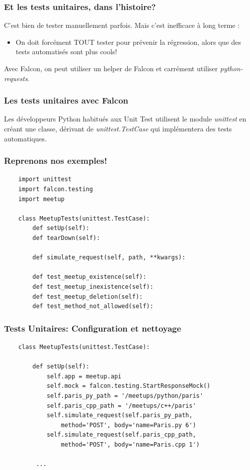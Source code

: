 \documentclass[10pt, compress]{beamer}
\begin{document}
\begin{frame}[fragile]
	\frametitle{Et les tests unitaires, dans l'histoire?}
    C'est bien de tester manuellement parfois.
    Mais c'est inefficace à long terme :
    \pause
    \begin{itemize}
    	\item On doit forcément \alert{TOUT} tester pour \alert{prévenir la régression}, alors que des tests automatisés sont plus cools!
    \end{itemize}
    \pause
    Avec Falcon, on peut utiliser un helper de Falcon et carrément utiliser \emph{python-requests}.
\end{frame}
\begin{frame}[fragile]
	\frametitle{Les tests unitaires avec Falcon}
    Les développeurs Python habitués aux Unit Test utilisent le module \emph{unittest} en créant une classe, dérivant de \emph{unittest.TestCase} qui implémentera des tests automatiques.
\end{frame}
\begin{frame}[fragile]
	\frametitle{Reprenons nos exemples!}
    
    \begin{verbatim}
    import unittest
    import falcon.testing
    import meetup
    
    class MeetupTests(unittest.TestCase):
        def setUp(self):
        def tearDown(self):
        
        def simulate_request(self, path, **kwargs):
        
        def test_meetup_existence(self):
        def test_meetup_inexistence(self):
        def test_meetup_deletion(self):
        def test_method_not_allowed(self):
    \end{verbatim}
\end{frame}
\begin{frame}[fragile]
	\frametitle{Tests Unitaires: Configuration et nettoyage}
    
    \begin{verbatim}
    class MeetupTests(unittest.TestCase):
    
        def setUp(self):
            self.app = meetup.api
            self.mock = falcon.testing.StartResponseMock()
            self.paris_py_path = '/meetups/python/paris'
            self.paris_cpp_path = '/meetups/c++/paris'
            self.simulate_request(self.paris_py_path,
                method='POST', body='name=Paris.py 6')
            self.simulate_request(self.paris_cpp_path,
            	method='POST', body='name=Paris.cpp 1')
         
         ...
    \end{verbatim}
\end{frame}
\end{document}
